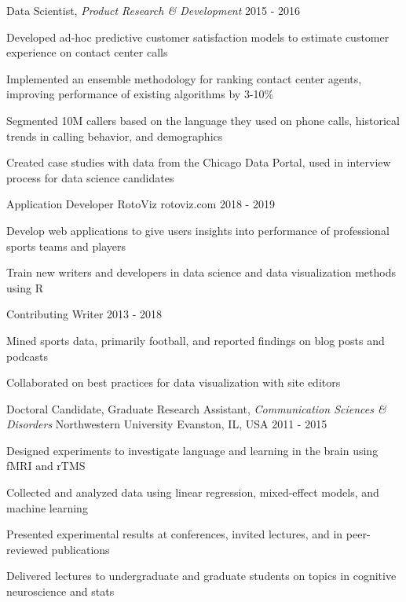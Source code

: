 \begin{cventries}
  \cventry
    {Data Scientist, \textit{Product Research \& Development}} %
    {} %
    {} %
    {2015 - 2016} %
    {
      \begin{cvitems} %
        \item {Developed ad-hoc predictive customer satisfaction models to estimate customer experience on contact center calls}
        \item {Implemented an ensemble methodology for ranking contact center agents, improving performance of existing algorithms by 3-10\%}
        \item {Segmented 10M callers based on the language they used on phone calls, historical trends in calling behavior, and demographics}
        \item {Created case studies with data from the Chicago Data Portal, used in interview process for data science candidates}
      \end{cvitems}
    }

 \cventry
    {Application Developer}
    {RotoViz}
    {rotoviz.com}
    {2018 - 2019}
    {
     \begin{cvitems}
       \item {Develop web applications to give users insights into performance of professional sports teams and players}
       \item {Train new writers and developers in data science and data visualization methods using R}
     \end{cvitems}
   }
   
   \cventry
   {Contributing Writer}
   {}
   {}
   {2013 - 2018}
   {
      \begin{cvitems}
       \item {Mined sports data, primarily football, and reported findings on blog posts and podcasts}
       \item {Collaborated on best practices for data visualization with site editors}
      \end{cvitems}
    }

 \cventry
    {Doctoral Candidate, Graduate Research Assistant, \textit{Communication Sciences \& Disorders}} %
    {Northwestern University} %
    {Evanston, IL, USA} %
    {2011 - 2015} %
   {
    \begin{cvitems}
    \item {Designed experiments to investigate language and learning in the brain using fMRI and rTMS}
    \item {Collected and analyzed data using linear regression, mixed-effect models, and machine learning}
    \item {Presented experimental results at conferences, invited lectures, and in peer-reviewed publications} 
    \item {Delivered lectures to undergraduate and graduate students on topics in cognitive neuroscience and stats} 
    \end{cvitems}
    }
    

\end{cventries}
